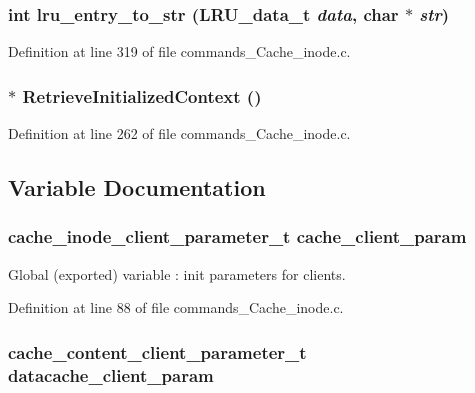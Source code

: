 \subsubsection[{lru\_\-entry\_\-to\_\-str}]{\setlength{\rightskip}{0pt plus 5cm}int lru\_\-entry\_\-to\_\-str (LRU\_\-data\_\-t {\em data}, \/  char $\ast$ {\em str})}\label{commands__Cache__inode_8c_ad3e6e5506644e1986e6475939863ad3e}


Definition at line 319 of file commands\_\-Cache\_\-inode.c.
\subsubsection[{RetrieveInitializedContext}]{$\ast$ RetrieveInitializedContext ()}\label{commands__Cache__inode_8c_aa2457d5b0e1f7d111a68951ab4d65638}


Definition at line 262 of file commands\_\-Cache\_\-inode.c.

\subsection{Variable Documentation}
\subsubsection[{cache\_\-client\_\-param}]{\setlength{\rightskip}{0pt plus 5cm}cache\_\-inode\_\-client\_\-parameter\_\-t {\bf cache\_\-client\_\-param}}\label{commands__Cache__inode_8c_ac4a598ccee46876cdc0985f55efe423e}
Global (exported) variable : init parameters for clients. 

Definition at line 88 of file commands\_\-Cache\_\-inode.c.
\subsubsection[{datacache\_\-client\_\-param}]{\setlength{\rightskip}{0pt plus 5cm}cache\_\-content\_\-client\_\-parameter\_\-t {\bf datacache\_\-client\_\-param}}\label{commands__Cache__inode_8c_aba08423105348649c3c814a48c699f4f}


